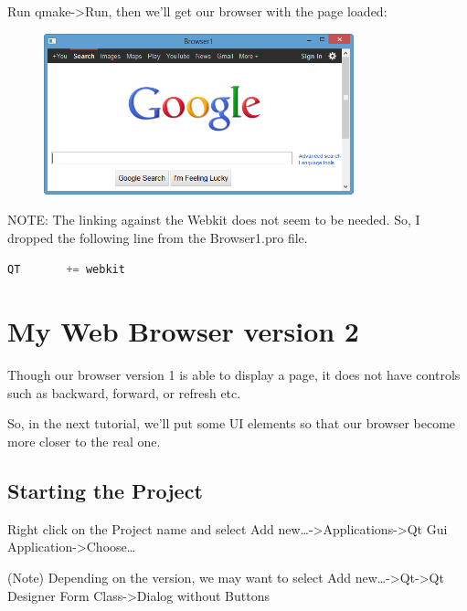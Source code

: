 Run qmake-\textgreater{}Run, then we'll get our browser with the page
loaded:

\begin{figure}[htbp]
\centering
\includegraphics[width=0.8\textwidth]{images/Browser1_Run.png}
\caption{}
\end{figure}

NOTE: The linking against the Webkit does not seem to be needed. So, I
dropped the following line from the Browser1.pro file.

\begin{lstlisting}[language=c++]
QT       += webkit
\end{lstlisting}

\section{My Web Browser version 2}\label{my-web-browser-version-2}

Though our browser version 1 is able to display a page, it does not have
controls such as backward, forward, or refresh etc.

So, in the next tutorial, we'll put some UI elements so that our browser
become more closer to the real one.

\subsection{Starting the Project}\label{starting-the-project}

Right click on the Project name and select Add
new\ldots{}-\textgreater{}Applications-\textgreater{}Qt Gui
Application-\textgreater{}Choose\ldots{}

(Note) Depending on the version, we may want to select Add
new\ldots{}-\textgreater{}Qt-\textgreater{}Qt Designer Form
Class-\textgreater{}Dialog without Buttons

